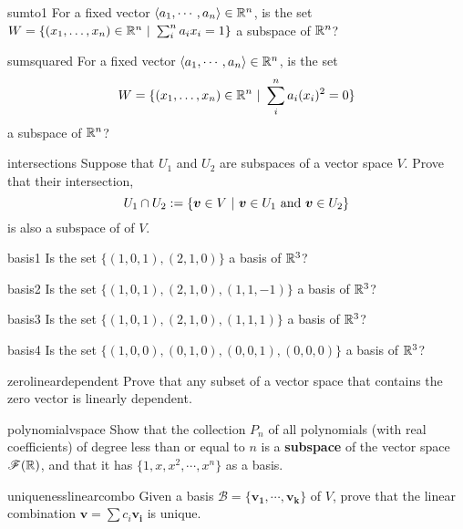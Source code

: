 \begin{problem}{sumto1}
For a fixed vector $\langle a_1, \cdots, a_n \rangle \in \mathbb{R}^n$, is the set $W = \{(x_1, \dots, x_n) \in \R^n \ | \ \sum^n_i a_ix_i = 1 \}$ a subspace of $\mathbb{R}^n$?
\end{problem}

\begin{problem}{sumsquared}
    For a fixed vector $\langle a_1, \cdots, a_n \rangle \in \mathbb{R}^n$, is the set $$W = \{(x_1, \dots, x_n) \in \mathbb{R}^n \ | \ \sum^n_i a_i(x_i)^2 = 0 \}$$ a subspace of $\mathbb{R}^n$?
\end{problem}

\begin{problem}{intersections}
    Suppose that $U_1$ and $U_2$ are subspaces of a vector space $V$.  Prove that their intersection, $$U_1 \cap U_2 := \{\bm{v} \in V \ | \ \bm{v} \in U_1 \textnormal{ and } \bm{v} \in U_2\}$$ is also a subspace of of $V$.
\end{problem}

\begin{problem}{basis1}
Is the set $\{(1,0,1), (2,1,0) \}$ a basis of $\mathbb{R}^3$?
\end{problem}

\begin{problem}{basis2}
Is the set $\{(1,0,1), (2,1,0), (1,1,-1) \}$ a basis of $\mathbb{R}^3$?
\end{problem}

\begin{problem}{basis3}
Is the set $\{(1,0,1), (2,1,0), (1,1,1) \}$ a basis of $\mathbb{R}^3$?
\end{problem}

\begin{problem}{basis4}
Is the set $\{(1,0,0), (0,1,0), (0,0,1), (0,0,0) \}$ a basis of $\mathbb{R}^3$?
\end{problem}

\begin{problem}{zerolineardependent}
Prove that any subset of a vector space that contains the zero vector is linearly
dependent.
\end{problem}

\begin{problem}{polynomialvspace}
Show that the collection $P_n$ of all polynomials (with real coefficients) of degree less than or equal to $n$ is a \textbf{subspace} of the vector space $\mathscr{F}(\mathbb{R})$, and that it has $\{1, x, x^2, \cdots, x^n\}$ as a basis.
\end{problem}

\begin{problem}{uniquenesslinearcombo}
Given a basis $\mathscr{B} = \{\bm{v_1}, \cdots, \bm{v_k}\}$ of $V$, prove that the linear combination $\bm{v} = \sum c_i \bm{v_i}$ is unique.
\end{problem}


